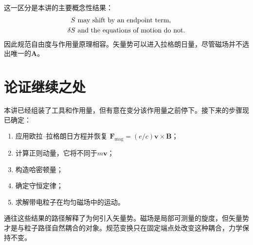 \begin{classroomqa}
\end{classroomqa}

这一区分是本讲的主要概念性结果：
\begin{equation}
  \begin{aligned}
    S&\ \hbox{may shift by an endpoint term},\\
    \delta S&\ \hbox{and the equations of motion do not}.
  \end{aligned}
\end{equation}
因此规范自由度与作用量原理相容。矢量势可以进入拉格朗日量，尽管磁场并不选出唯一的\(\mathbf A\)。

\section{论证继续之处}

本讲已经组装了工具和作用量，但有意在变分该作用量之前停下。接下来的步骤现已确定：
\begin{enumerate}
  \item 应用欧拉--拉格朗日方程并恢复
  \(\mathbf F_{\mathrm{mag}}=(e/c)\mathbf v\times\mathbf B\)；
  \item 计算正则动量，它将不同于\(m\mathbf v\)；
  \item 构造哈密顿量；
  \item 确定守恒定律；
  \item 求解带电粒子在均匀磁场中的运动。
\end{enumerate}

通往这些结果的路径解释了为何引入矢量势。磁场是局部可测量的旋度，但矢量势才是与粒子路径自然耦合的对象。规范变换只在固定端点处改变这种耦合，力学保持不变。
